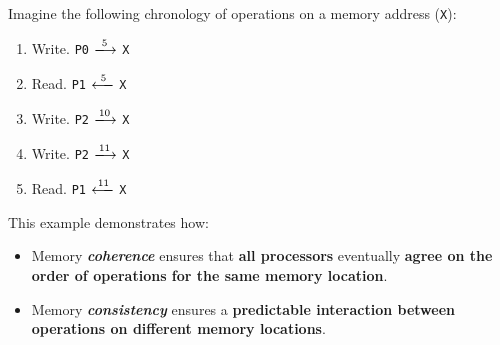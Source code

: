 \begin{examplebox}
    Imagine the following chronology of operations on a memory address (\texttt{X}):
    \begin{enumerate}[label={$t = $ \arabic*.}]
        \item Write. \texttt{P0} $\xlongrightarrow{5}$ \texttt{X}
        \item Read. \texttt{P1} $\xlongleftarrow{5}$ \texttt{X}
        \item Write. \texttt{P2} $\xlongrightarrow{10}$ \texttt{X}
        \item Write. \texttt{P2} $\xlongrightarrow{11}$ \texttt{X}
        \item Read. \texttt{P1} $\xlongleftarrow{11}$ \texttt{X}
    \end{enumerate}
    This example demonstrates how:
    \begin{itemize}
        \item Memory \textbf{\emph{coherence}} ensures that \textbf{all processors} eventually \textbf{agree on the order of operations for the same memory location}.

        \item Memory \textbf{\emph{consistency}} ensures a \textbf{predictable interaction between operations on different memory locations}.
    \end{itemize}
\end{examplebox}

